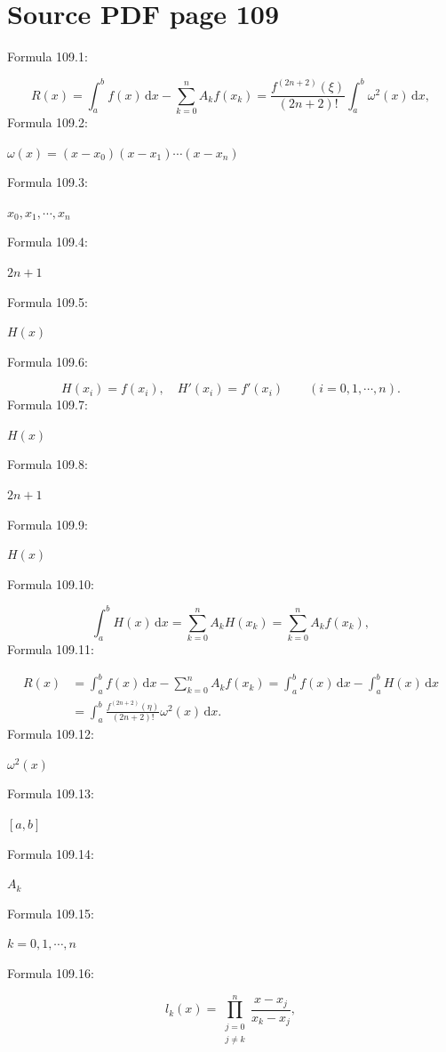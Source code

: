 \documentclass[11pt]{article}
\begin{document}
\section*{Source PDF page 109}
\noindent Formula 109.1:\par
\[
R(x)=\int_a^b f(x)\,\mathrm{d}x-\sum_{k=0}^{n}A_kf(x_k)
=\frac{f^{(2n+2)}(\xi)}{(2n+2)!}\int_a^b\omega^2(x)\,\mathrm{d}x,
\tag{4.4.5}
\]
\noindent Formula 109.2:\par
$\omega(x)=(x-x_0)(x-x_1)\cdots(x-x_n)$\par
\noindent Formula 109.3:\par
$x_0,x_1,\cdots,x_n$\par
\noindent Formula 109.4:\par
$2n+1$\par
\noindent Formula 109.5:\par
$H(x)$\par
\noindent Formula 109.6:\par
\[
H(x_i)=f(x_i),\quad H'(x_i)=f'(x_i)\qquad(i=0,1,\cdots,n).
\]
\noindent Formula 109.7:\par
$H(x)$\par
\noindent Formula 109.8:\par
$2n+1$\par
\noindent Formula 109.9:\par
$H(x)$\par
\noindent Formula 109.10:\par
\[
\int_a^b H(x)\,\mathrm{d}x
=\sum_{k=0}^{n}A_kH(x_k)=\sum_{k=0}^{n}A_kf(x_k),
\]
\noindent Formula 109.11:\par
\[
\begin{aligned}
R(x)&=\int_a^b f(x)\,\mathrm{d}x-\sum_{k=0}^{n}A_kf(x_k)
=\int_a^b f(x)\,\mathrm{d}x-\int_a^b H(x)\,\mathrm{d}x\\
&=\int_a^b\frac{f^{(2n+2)}(\eta)}{(2n+2)!}\omega^2(x)\,\mathrm{d}x.
\end{aligned}
\]
\noindent Formula 109.12:\par
$\omega^2(x)$\par
\noindent Formula 109.13:\par
$[a,b]$\par
\noindent Formula 109.14:\par
$A_k$\par
\noindent Formula 109.15:\par
$k=0,1,\cdots,n$\par
\noindent Formula 109.16:\par
\[
l_k(x)=\prod_{\substack{j=0\\j\ne k}}^{n}\frac{x-x_j}{x_k-x_j},
\]
\end{document}
